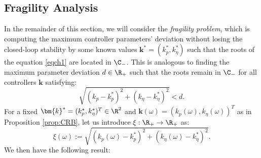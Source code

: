 \documentclass[twoside,reqno,11pt]{fcaa-var} %
\begin{document}
\subsection{Fragility Analysis}
In the remainder of this section, we will consider the \textit{fragility problem}, which is computing the maximum controller parameters' deviation without losing the closed-loop stability by some known values $\bm{k}^*=\left(k_p^*,k_\eta^*\right)$ such that the roots of the equation \eqref{eqch1} are located in ${\C}_{-}$. This is analogous to finding the maximum parameter deviation $d\in\R_+$ such that the roots remain in $\C_-$ for all controllers $\bm{k}$ satisfying:
\begin{equation}
\sqrt{(k_p-k_p^*)^2+(k_\eta-k_\eta^*)^2}<d.
\end{equation}
For a fixed $\bm{k}^*=(k_p^*,k_\eta^*)^T\in\R^2$ and $\bm{k}(\omega)=(k_p(\omega),k_\eta(\omega))^T$ as in Proposition \ref{prop:CRB}, let us introduce $\xi:\R_+\rightarrow\R_+$ as:
\begin{equation}
\xi(\omega):=\sqrt{(k_p(\omega)-k_p^*)^2+(k_\eta(\omega)-k_\eta^*)^2}. \label{eqfragilitya}
\end{equation}
We then have the following result:
\end{document}
